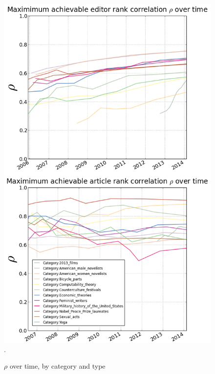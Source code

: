 \documentclass{acm_proc_article-sp}
\begin{document}
\begin{figure}[!t]
\centering
\includegraphics[width=0.9\columnwidth]{rho_combined.png}.
\caption{$\rho$ over time, by category and type}
\label{fig:rhotime}
\end{figure}




\end{document}
